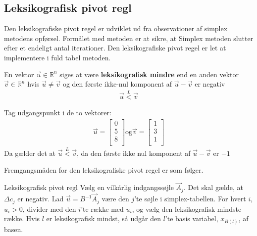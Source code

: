 \subsection{Leksikografisk pivot regl}
Den leksikografiske pivot regel er udviklet ud fra observationer af simplex metodens opførsel. Formålet med metoden er at sikre, at Simplex metoden slutter efter et endeligt antal iterationer. Den leksikografiske pivot regel er let at implementere i fuld tabel metoden. 
\begin{defn}
En vektor $\vec{u} \in \mathds{R}^n$ siges at være \textbf{leksikografisk mindre} end en anden vektor $\vec{v} \in \mathds{R}^n$ hvis $\vec{u} \neq \vec{v}$ og den første ikke-nul komponent af $\vec{u}-\vec{v}$ er negativ 
\begin{align*}
\vec{u} \overset{L}{<} \vec{v}
\end{align*}
\end{defn}
\begin{eks}
Tag udgangspunkt i de to vektorer: 
\begin{align*}
\vec{u}=
\begin{bmatrix}
0\\
5\\
8\\
\end{bmatrix}
\text{og}
\vec{v}= 
\begin{bmatrix}
1\\
3\\
1\\
\end{bmatrix}
\end{align*}
Da gælder det at $\vec{u} \overset{L}{<} \vec{v}$, da den første ikke nul komponent af $\vec{u}-\vec{v}$ er $-1$
\end{eks}

Fremgangsmåden for den leksikografiske pivot regel er som følger.
  
\begin{pro}{Leksikografisk pivot regl}
Vælg en vilkårlig indgangssøjle $\vec{A}_j$. Det skal gælde, at $\Delta c_j$ er negativ. Lad $\vec{u}=B^{-1}\vec{A}_j$ være den $j$'te søjle i simplex-tabellen.
For hvert $i$, $u_i>0$, divider med den $i$'te række med $u_i$, og vælg den leksikografisk mindste række. Hvis $l$ er leksikografisk mindst, så udgår den $l$'te basis variabel, $x_{B(l)}$, af basen. 
\end{pro}

